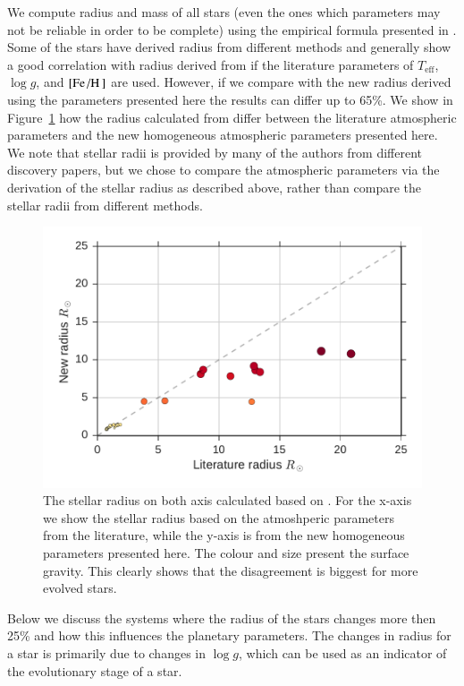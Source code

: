 \documentclass{aa}
\begin{document}
We compute radius and mass of all stars (even the ones which parameters may not
be reliable in order to be complete) using the empirical formula presented in
\citet{Torres2010}. Some of the stars have derived radius from different methods
and generally show a good correlation with radius derived from
\citet{Torres2010} if the literature parameters of $T_\mathrm{eff}$, $\log g$,
and $[\ion{Fe}/\ion{H}]$ are used. However, if we compare with the new radius
derived using the parameters presented here the results can differ up to 65\%.
We show in Figure~\ref{fig:RR} how the radius calculated from \citet{Torres2010}
differ between the literature atmospheric parameters and the new homogeneous
atmospheric parameters presented here. We note that stellar radii is provided by
many of the authors from different discovery papers, but we chose to compare the
atmospheric parameters via the derivation of the stellar radius as described
above, rather than compare the stellar radii from different methods.

\begin{figure}[tpb]
    \centering
    \includegraphics[width=1.0\linewidth]{figures/radiusVSradius.pdf}
    \caption{The stellar radius on both axis calculated based on \citet{Torres2010}.
    For the x-axis we show the stellar radius based on the atmoshperic parameters
    from the literature, while the y-axis is from the new homogeneous parameters
    presented here. The colour and size present the surface gravity. This clearly
    shows that the disagreement is biggest for more evolved stars.}
    \label{fig:RR}
\end{figure}

Below we discuss the systems where the radius of the stars changes more then
25\% and how this influences the planetary parameters. The changes in radius for
a star is primarily due to changes in $\log g$, which can be used as an
indicator of the evolutionary stage of a star.
\end{document}
